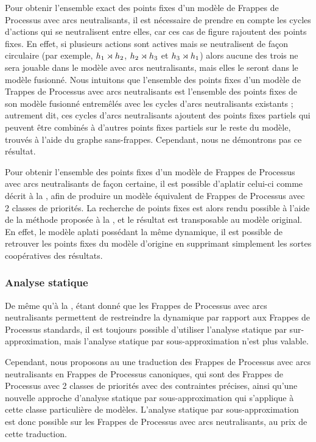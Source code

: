 Pour obtenir l'ensemble exact des points fixes d'un modèle de Frappes de Processus
avec arcs neutralisants, il est nécessaire de prendre en compte les cycles d'actions
qui se neutralisent entre elles, car ces cas de figure rajoutent des points fixes.
En effet, si plusieurs actions sont actives mais se neutralisent de façon circulaire
(par exemple, $h_1\rtimes h_2$, $h_2\rtimes h_3$ et $h_3\rtimes h_1$)
alors aucune des trois ne sera jouable dans le modèle avec arcs neutralisants,
mais elles le seront dans le modèle fusionné.
Nous intuitons que l'ensemble des points fixes d'un modèle de Trappes de Processus avec
arcs neutralisants est l'ensemble des points fixes de son modèle fusionné
entremêlés avec les cycles d'arcs neutralisants existants ;
autrement dit, ces cycles d'arcs neutralisants ajoutent des points fixes partiels
qui peuvent être combinés à d'autres points fixes partiels sur le reste du modèle,
trouvés à l'aide du graphe sans-frappes.
Cependant, nous ne démontrons pas ce résultat.

\myskip

Pour obtenir l'ensemble des points fixes d'un modèle de Frappes de Processus
avec arcs neutralisants de façon certaine, il est possible d'aplatir celui-ci
comme décrit à la ,
afin de produire un modèle équivalent de Frappes de Processus avec 2 classes de priorités.
La recherche de points fixes est alors rendu possible à l'aide de la méthode
proposée à la ,
et le résultat est transposable au modèle original.
En effet, le modèle aplati possédant la même dynamique,
il est possible de retrouver les points fixes du modèle d'origine
en supprimant simplement les sortes coopératives des résultats.

\subsubsection{Analyse statique}

De même qu'à la ,
étant donné que les Frappes de Processus avec arcs neutralisants permettent de restreindre
la dynamique par rapport aux Frappes de Processus standards, il est toujours possible
d'utiliser l'analyse statique par sur-approximation,
mais l'analyse statique par sous-approximation n'est plus valable.

Cependant, nous proposons au 
une traduction des Frappes de Processus avec arcs neutralisants en Frappes de Processus canoniques,
qui sont des Frappes de Processus avec 2 classes de priorités avec des contraintes précises,
ainsi qu'une nouvelle approche d'analyse statique par sous-approximation
qui s'applique à cette classe particulière de modèles.
L'analyse statique par sous-approximation est donc possible sur les Frappes de Processus
avec arcs neutralisants, au prix de cette traduction.

